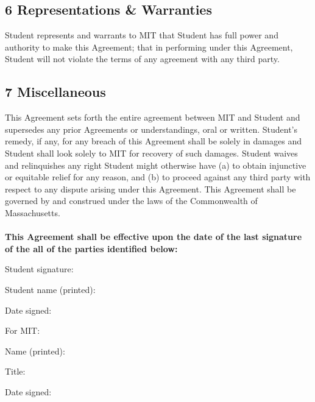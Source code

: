\documentclass{article}
\begin{document}
\vspace{0.5cm}
\subsection*{6 Representations \& Warranties}
Student represents and warrants to MIT that Student has full power and authority to make this Agreement; that in performing under this Agreement, Student will not violate the terms of any agreement with any third party.

\vspace{0.5cm}
\subsection*{7 Miscellaneous}
This Agreement sets forth the entire agreement between MIT and Student and supersedes any prior Agreements or understandings, oral or written. Student’s remedy, if any, for any breach of this Agreement shall be solely in damages and Student shall look solely to MIT for recovery of such damages. Student waives and relinquishes any right Student might otherwise have (a) to obtain injunctive or equitable relief for any reason, and (b) to proceed against any third party with respect to any dispute arising under this Agreement. This Agreement shall be governed by and construed under the laws of the Commonwealth of Massachusetts.
\\\\
\textbf{This Agreement shall be effective upon the date of the last signature of the all of the parties identified below:}
\\
\begin{tcolorbox}[colback=black!0!white,colframe=black!75!black, boxrule = 0pt, frame hidden, sharpish corners]
\vspace{0.7cm}
Student signature: \makebox[7cm]{\hrulefill}

\vspace{0.7cm}
Student name (printed): \makebox[6cm]{\hrulefill}

\vspace{0.7cm}
Date signed: \makebox[8cm]{\hrulefill}
\end{tcolorbox}

\begin{tcolorbox}[colback=black!5!white,colframe=black!75!black, sharpish corners,title=FOR OCW USE ONLY]
\vspace{0.7cm}
For MIT: \makebox[8cm]{\hrulefill}

\vspace{0.7cm}
Name (printed): \makebox[7cm]{\hrulefill}

\vspace{0.7cm}
Title: \makebox[9cm]{\hrulefill}

\vspace{0.7cm}
Date signed: \makebox[8cm]{\hrulefill}
\end{tcolorbox}
\end{document}
